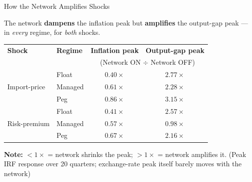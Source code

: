 \documentclass[aspectratio=43, 10pt]{beamer}
\begin{document}
\begin{frame}{How the Network Amplifies Shocks}

{\footnotesize The network \textcolor{fxgreen}{\textbf{dampens}} the inflation peak but \textcolor{riskred}{\textbf{amplifies}} the output-gap peak --- in \emph{every} regime, for \emph{both} shocks. }

\vspace{5pt}
\begin{center}
{\scriptsize
\renewcommand{\arraystretch}{1.15}
\begin{tabular}{@{}llcc@{}}
\toprule
\textbf{Shock} & \textbf{Regime} & \textbf{Inflation peak} & \textbf{Output-gap peak} \\
 & & \multicolumn{2}{c}{(Network ON $\div$ Network OFF)} \\
\midrule
\multirow{3}{*}{Import-price} & Float   & \textcolor{fxgreen}{$0.40\times$} & \textcolor{riskred}{$2.77\times$} \\
 & Managed & \textcolor{fxgreen}{$0.61\times$} & \textcolor{riskred}{$2.28\times$} \\
 & Peg     & \textcolor{fxgreen}{$0.86\times$} & \textcolor{riskred}{$\mathbf{3.15\times}$ } \\
\midrule
\multirow{3}{*}{Risk-premium} & Float   & \textcolor{fxgreen}{$0.41\times$} & \textcolor{riskred}{$\mathbf{2.57\times}$} \\
 & Managed & \textcolor{fxgreen}{$0.57\times$} & $0.98\times$  \\
 & Peg     & \textcolor{fxgreen}{$0.67\times$} & \textcolor{riskred}{$2.16\times$} \\
\bottomrule
\end{tabular}}
\end{center}

\vspace{3pt}
{\scriptsize \textbf{Note:} $<1\times$ = network shrinks the peak; $>1\times$ = network amplifies it. (Peak IRF response over 20 quarters; exchange-rate peak itself barely moves with the network)}

\end{frame}
\end{document}
